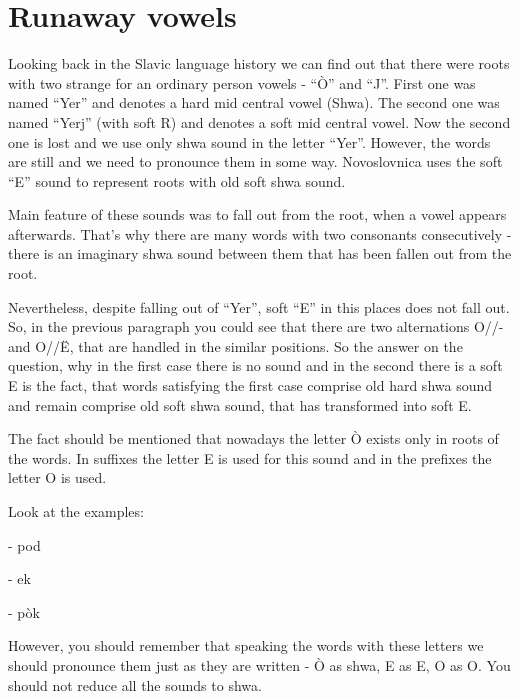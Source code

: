 \section{Runaway vowels}

Looking back in the Slavic language history we can find out that there were roots with two strange for an ordinary person vowels - “Ò” and “J”. First one was named “Yer” and denotes a hard mid central vowel (Shwa). The second one was named “Yerj” (with soft R) and denotes a soft mid central vowel. Now the second one is lost and we use only shwa sound in the letter “Yer”. However, the words are still and we need to pronounce them in some way. Novoslovnica uses the soft “E” sound to represent roots with old soft shwa sound.

Main feature of these sounds was to fall out from the root, when a vowel appears afterwards. That’s why there are many words with two consonants consecutively - there is an imaginary shwa sound between them that has been fallen out from the root.

Nevertheless, despite falling out of “Yer”, soft “E” in this places does not fall out. So, in the previous paragraph you could see that there are two alternations O//- and O//Ë, that are handled in the similar positions. So the answer on the question, why in the first case there is no sound and in the second there is a soft E is the fact, that words satisfying the first case comprise old hard shwa sound and remain comprise old soft shwa sound, that has transformed into soft E.

The fact should be mentioned that nowadays the letter Ò exists only in roots of the words. In suffixes the letter E is used for this sound and in the prefixes the letter O is used.

Look at the examples:

- pod 

- ek

- pòk  

However, you should remember that speaking the words with these letters we should pronounce them just as they are written - Ò as shwa, E as E, O as O. You should not reduce all the sounds to shwa. 
